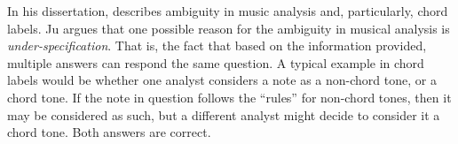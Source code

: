 

In his dissertation, \textcite{ju2021addressing} describes
ambiguity in music analysis and, particularly, chord labels.
Ju argues that one possible reason for the ambiguity in
musical analysis is \emph{under-specification}. That is, the
fact that based on the information provided, multiple
answers can respond the same question. A typical example in
chord labels would be whether one analyst considers a note
as a non-chord tone, or a chord tone. If the note in
question follows the ``rules'' for non-chord tones, then it
may be considered as such, but a different analyst might
decide to consider it a chord tone. Both answers are
correct.

